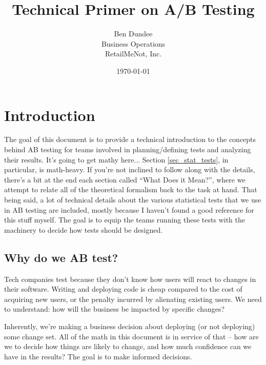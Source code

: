 \documentclass{article}
\numberwithin{equation}{section}
\begin{document}
\title{Technical Primer on A/B Testing}
\author{Ben Dundee\\Business Operations\\RetailMeNot, Inc.}
\date{\today}
\maketitle

\tableofcontents

\section{Introduction}

The goal of this document is to provide a technical introduction to the concepts behind AB testing for teams involved in planning/defining tests and analyzing their results. It's going to get mathy here... Section \ref{sec_stat_tests}, in particular, is math-heavy. If you're not inclined to follow along with the details, there's a bit at the end each section called ``What Does it Mean?'', where we attempt to relate all of the theoretical formalism back to the task at hand. That being said, a lot of technical details about the various statistical tests that we use in AB testing are included, mostly because I haven't found a good reference for this stuff myself. The goal is to equip the teams running these tests with the machinery to decide how tests should be designed.

\subsection{Why do we AB test?}
Tech companies test because they don't know how users will react to changes in their software. Writing and deploying code is cheap compared to the cost of acquiring new users, or the penalty incurred by alienating existing users. We need to understand: how will the business be impacted by specific changes?

Inherently, we're making a business decision about deploying (or not deploying) some change set. All of the math in this document is in service of that -- how are we to decide how things are likely to change, and how much confidence can we have in the results? The goal is to make informed decisions.
\end{document}
